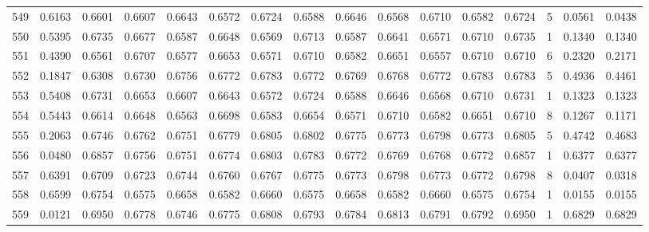 \begin{tabular}{lrrrrrrrrrrrrrrr}
549 &      0.6163 &  0.6601 &  0.6607 &  0.6643 &  0.6572 &  0.6724 &  0.6588 &  0.6646 &  0.6568 &  0.6710 &   0.6582 &     0.6724 &      5 &                    0.0561 &                     0.0438 \\
550 &      0.5395 &  0.6735 &  0.6677 &  0.6587 &  0.6648 &  0.6569 &  0.6713 &  0.6587 &  0.6641 &  0.6571 &   0.6710 &     0.6735 &      1 &                    0.1340 &                     0.1340 \\
551 &      0.4390 &  0.6561 &  0.6707 &  0.6577 &  0.6653 &  0.6571 &  0.6710 &  0.6582 &  0.6651 &  0.6557 &   0.6710 &     0.6710 &      6 &                    0.2320 &                     0.2171 \\
552 &      0.1847 &  0.6308 &  0.6730 &  0.6756 &  0.6772 &  0.6783 &  0.6772 &  0.6769 &  0.6768 &  0.6772 &   0.6783 &     0.6783 &      5 &                    0.4936 &                     0.4461 \\
553 &      0.5408 &  0.6731 &  0.6653 &  0.6607 &  0.6643 &  0.6572 &  0.6724 &  0.6588 &  0.6646 &  0.6568 &   0.6710 &     0.6731 &      1 &                    0.1323 &                     0.1323 \\
554 &      0.5443 &  0.6614 &  0.6648 &  0.6563 &  0.6698 &  0.6583 &  0.6654 &  0.6571 &  0.6710 &  0.6582 &   0.6651 &     0.6710 &      8 &                    0.1267 &                     0.1171 \\
555 &      0.2063 &  0.6746 &  0.6762 &  0.6751 &  0.6779 &  0.6805 &  0.6802 &  0.6775 &  0.6773 &  0.6798 &   0.6773 &     0.6805 &      5 &                    0.4742 &                     0.4683 \\
556 &      0.0480 &  0.6857 &  0.6756 &  0.6751 &  0.6774 &  0.6803 &  0.6783 &  0.6772 &  0.6769 &  0.6768 &   0.6772 &     0.6857 &      1 &                    0.6377 &                     0.6377 \\
557 &      0.6391 &  0.6709 &  0.6723 &  0.6744 &  0.6760 &  0.6767 &  0.6775 &  0.6773 &  0.6798 &  0.6773 &   0.6772 &     0.6798 &      8 &                    0.0407 &                     0.0318 \\
558 &      0.6599 &  0.6754 &  0.6575 &  0.6658 &  0.6582 &  0.6660 &  0.6575 &  0.6658 &  0.6582 &  0.6660 &   0.6575 &     0.6754 &      1 &                    0.0155 &                     0.0155 \\
559 &      0.0121 &  0.6950 &  0.6778 &  0.6746 &  0.6775 &  0.6808 &  0.6793 &  0.6784 &  0.6813 &  0.6791 &   0.6792 &     0.6950 &      1 &                    0.6829 &                     0.6829 \\

\end{tabular}
